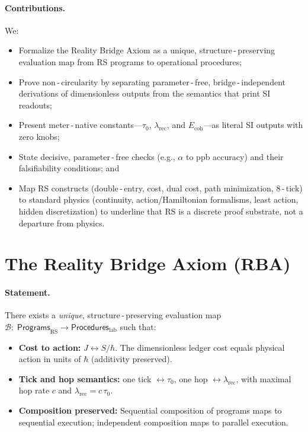 \documentclass[11pt]{article}
\newcommand{\lamrec}{\lambda_{\mathrm{rec}}}
\newcommand{\tauzero}{\tau_{0}}
\newcommand{\Ecoh}{E_{\mathrm{coh}}}
\theoremstyle{remark}
\begin{document}
\paragraph{Contributions.} We:
\begin{itemize}
  \item Formalize the Reality Bridge Axiom as a unique, structure\,\mbox{-}\,preserving evaluation map from RS programs to operational procedures;
  \item Prove non\,\mbox{-}\,circularity by separating parameter\,\mbox{-}\,free, bridge\,\mbox{-}\,independent derivations of dimensionless outputs from the semantics that print SI readouts;
  \item Present meter\,\mbox{-}\,native constants---$\tauzero$, $\lamrec$, and $\Ecoh$---as literal SI outputs with zero knobs;
  \item State decisive, parameter\,\mbox{-}\,free checks (e.g., $\alpha$ to ppb accuracy) and their falsifiability conditions; and
  \item Map RS constructs (double\,\mbox{-}\,entry, cost, dual cost, path minimization, 8\,\mbox{-}\,tick) to standard physics (continuity, action/Hamiltonian formalisms, least action, hidden discretization) to underline that RS is a discrete proof substrate, not a departure from physics.
\end{itemize}

\section{The Reality Bridge Axiom (RBA)}
\paragraph{Statement.}
There exists a \emph{unique}, structure\,\mbox{-}\,preserving evaluation map
\(
  \mathcal B:\; \textsf{Programs}_{\mathrm{RS}} \longrightarrow \textsf{Procedures}_{\mathrm{lab}}
\)
such that:
\begin{itemize}
  \item \textbf{Cost to action:} \;\(J \leftrightarrow S/\hbar\). The dimensionless ledger cost equals physical action in units of $\hbar$ (additivity preserved).
  \item \textbf{Tick and hop semantics:} \;one tick $\leftrightarrow \tauzero$, one hop $\leftrightarrow \lamrec$, with maximal hop rate $c$ and \(\lamrec = c\,\tauzero\).
  \item \textbf{Composition preserved:} \;Sequential composition of programs maps to sequential execution; independent composition maps to parallel execution.
\end{itemize}
\end{document}
